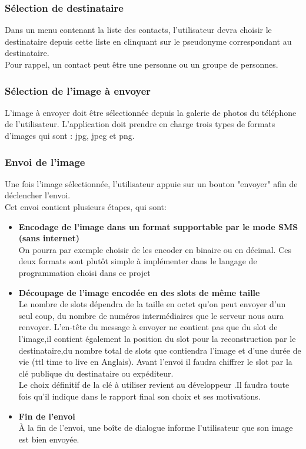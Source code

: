 \documentclass[a4paper, 12pt]{article}
\begin{document}
        \subsubsection{Sélection de destinataire}
        Dans un menu contenant la liste des contacts, l'utilisateur devra choisir le destinataire depuis cette liste en clinquant sur le pseudonyme correspondant au destinataire.\\
        Pour rappel, un contact peut être une personne ou un groupe de personnes.\\
        
        
        \subsubsection{Sélection de l'image à envoyer}
        L'image à envoyer doit être sélectionnée depuis la galerie de photos du téléphone de l'utilisateur.
         L'application doit prendre en charge trois types de formats d’images qui sont : jpg, jpeg et png. 
        \subsubsection{Envoi de l'image}
        
        Une fois l'image sélectionnée, l'utilisateur appuie sur un bouton "envoyer" afin de déclencher l'envoi.\\
        Cet envoi contient plusieurs étapes, qui sont:\\
            \begin{itemize}
              \item \textbf{Encodage de l'image dans un format supportable par le mode SMS (sans internet)}\\
              On pourra par exemple choisir de les encoder en binaire ou en décimal. Ces deux formats sont plutôt simple à implémenter dans le langage de programmation choisi dans ce projet
              \item \textbf{Découpage de l'image encodée en des slots de même taille} \\
              Le nombre de slots dépendra de la taille en octet qu'on peut envoyer d'un seul coup, du nombre de numéros intermédiaires que le serveur nous aura renvoyer. 
              L'en-tête du message à envoyer ne contient pas que du slot de l'image,il contient également
              la position du slot pour la reconstruction par le destinataire,du nombre total de slots que contiendra l'image et d'une durée de vie (ttl time to live en Anglais).
              Avant l'envoi il faudra chiffrer le slot par la clé publique du destinataire ou expéditeur.\\
              Le choix définitif de la clé à utiliser revient au développeur .Il faudra toute fois qu'il  indique dans le rapport final son choix et ses motivations. 
              \item \textbf {Fin de l'envoi} \\
              À la fin de l'envoi, une boîte de dialogue informe l’utilisateur que son image est bien envoyée.  

            \end{itemize} 
\end{document}
